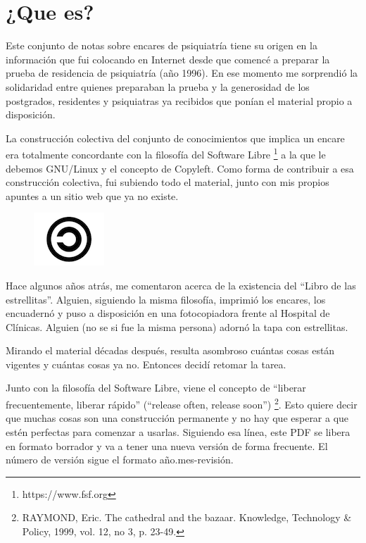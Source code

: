 \chapter{¿Que es?}
Este conjunto de notas sobre encares de psiquiatría tiene su origen en la información que fui colocando en Internet desde que comencé a preparar la prueba de residencia de psiquiatría (año 1996). En ese momento me sorprendió la solidaridad entre quienes preparaban la prueba y la generosidad de los postgrados, residentes y psiquiatras ya recibidos que ponían el material propio a disposición.

La construcción colectiva del conjunto de conocimientos que implica un encare era totalmente concordante con la filosofía del Software Libre \footnote{https://www.fsf.org} a la que le debemos GNU/Linux y el concepto de Copyleft. Como forma de contribuir a esa construcción colectiva, fui subiendo todo el material, junto con mis propios apuntes a un sitio web que ya no existe.

\begin{figure}
	\centering
	\includegraphics{copyleft.png}
\end{figure}
Hace algunos años atrás, me comentaron acerca de la existencia del ``Libro de las estrellitas''. Alguien, siguiendo la misma filosofía, imprimió los encares, los encuadernó y puso a disposición en una fotocopiadora frente al Hospital de Clínicas. Alguien (no se si fue la misma persona) adornó la tapa con estrellitas.

Mirando el material décadas después, resulta asombroso cuántas cosas están vigentes y cuántas cosas ya no. Entonces decidí retomar la tarea.

Junto con la filosofía del Software Libre, viene el concepto de ``liberar frecuentemente, liberar rápido'' (``release often, release soon'') \footnote{RAYMOND, Eric. The cathedral and the bazaar. Knowledge, Technology \& Policy, 1999, vol. 12, no 3, p. 23-49.}. Esto quiere decir que muchas cosas son una construcción permanente y no hay que esperar a que estén perfectas para comenzar a usarlas. Siguiendo esa línea, este PDF se libera en formato borrador y va a tener una nueva versión de forma frecuente. El número de versión sigue el formato año.mes-revisión.
